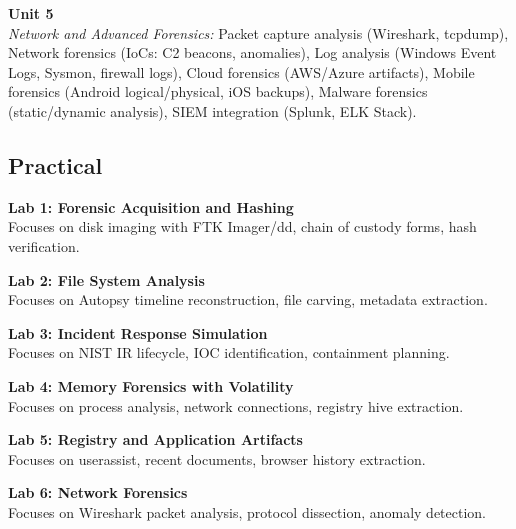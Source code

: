 \vspace{0.3cm}

\noindent\textbf{Unit 5} \\
\textit{Network and Advanced Forensics:} Packet capture analysis (Wireshark, tcpdump), Network forensics (IoCs: C2 beacons, anomalies), Log analysis (Windows Event Logs, Sysmon, firewall logs), Cloud forensics (AWS/Azure artifacts), Mobile forensics (Android logical/physical, iOS backups), Malware forensics (static/dynamic analysis), SIEM integration (Splunk, ELK Stack).

\newpage

\subsection*{Practical}
\noindent\textbf{Lab 1: Forensic Acquisition and Hashing} \\
Focuses on disk imaging with FTK Imager/dd, chain of custody forms, hash verification.

\vspace{0.2cm}

\noindent\textbf{Lab 2: File System Analysis} \\
Focuses on Autopsy timeline reconstruction, file carving, metadata extraction.

\vspace{0.2cm}

\noindent\textbf{Lab 3: Incident Response Simulation} \\
Focuses on NIST IR lifecycle, IOC identification, containment planning.

\vspace{0.2cm}

\noindent\textbf{Lab 4: Memory Forensics with Volatility} \\
Focuses on process analysis, network connections, registry hive extraction.

\vspace{0.2cm}

\noindent\textbf{Lab 5: Registry and Application Artifacts} \\
Focuses on userassist, recent documents, browser history extraction.

\vspace{0.2cm}

\noindent\textbf{Lab 6: Network Forensics} \\
Focuses on Wireshark packet analysis, protocol dissection, anomaly detection.

\vspace{0.2cm}

